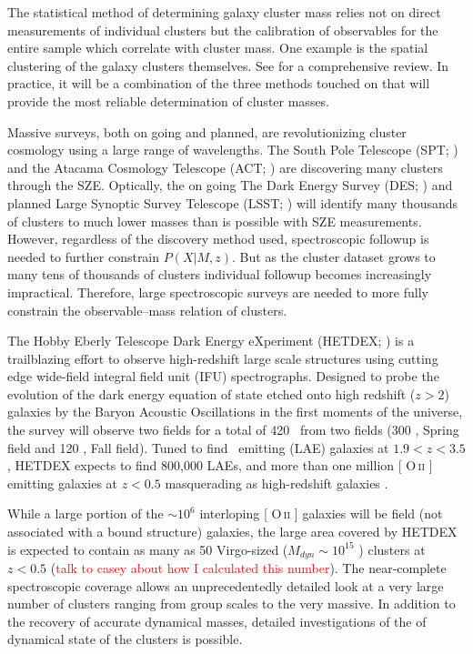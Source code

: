 \documentclass[fleqn,usenatbib]{mnras}
\makeatletter
\newcommand{\editorial}[1]{\textcolor{red}{#1}}
\DeclareRobustCommand{\ion}[2]{%
\relax\ifmmode
\ifx\testbx\f@series
{\mathbf{#1\,\mathsc{#2}}}\else
{\mathrm{#1\,\mathsc{#2}}}\fi
\else\textup{#1\,{\mdseries\textsc{#2}}}%
\fi}
\makeatother
\begin{document}
The statistical method of determining galaxy cluster mass relies not on direct measurements of individual clusters but the calibration of observables for the entire sample which correlate with cluster mass. One example is the spatial clustering of the galaxy clusters themselves. See \cite{Weinberg2013} for a comprehensive review. In practice, it will be a combination of the three methods touched on that will provide the most reliable determination of cluster masses.

Massive surveys, both on going and planned, are revolutionizing cluster cosmology using a large range of wavelengths. The South Pole Telescope (SPT; \citealt{Carlstrom2011}) and the Atacama Cosmology Telescope (ACT; \citealt{Swetz2011}) are discovering many clusters through the SZE. Optically, the on going The Dark Energy Survey (DES; \citealt{DES2005}) and planned Large Synoptic Survey Telescope (LSST; \citealt{LSST2012}) will identify many thousands of clusters to much lower masses than is possible with SZE measurements. However, regardless of the discovery method used, spectroscopic followup is needed to further constrain $P(X|M,z)$. But as the cluster dataset grows to many tens of thousands of clusters individual followup becomes increasingly impractical. Therefore, large spectroscopic surveys are needed to more fully constrain the observable--mass relation of clusters.

The Hobby Eberly Telescope Dark Energy eXperiment (HETDEX; \citealt{Hill2008}) is a trailblazing effort to observe high-redshift large scale structures using cutting edge wide-field integral field unit (IFU) spectrographs. Designed to probe the evolution of the dark energy equation of state etched onto high redshift ($z>2$) galaxies by the Baryon Acoustic Oscillations \citep{Eisenstein2005} in the first moments of the universe, the survey will observe two fields for a total of 420 \degsq\ from two fields (300 \degsq, Spring field and 120 \degsq, Fall field). Tuned to find \lya\ emitting (LAE) galaxies at $1.9<z<3.5$, HETDEX expects to find 800,000 LAEs, and more than one million [\ion{O}{ii}] emitting galaxies at $z<0.5$ masquerading as high-redshift galaxies \citep{Acquaviva2014}. 

While a large portion of the $\sim10^6$ interloping [\ion{O}{ii}] galaxies will be field (not associated with a bound structure) galaxies, the large area covered by HETDEX is expected to contain as many as 50 Virgo-sized ($M_{dyn}\sim 10^{15}$ \msol) clusters at $z<0.5$ (\editorial{talk to casey about how I calculated this number}). The near-complete spectroscopic coverage allows an unprecedentedly detailed look at a very large number of clusters ranging from group scales to the very massive. In addition to the recovery of accurate dynamical masses, detailed investigations of the of dynamical state of the clusters is possible. 
\end{document}
